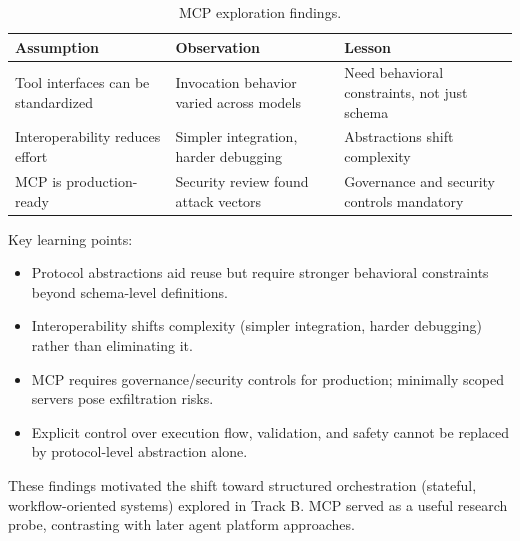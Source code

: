 \begin{table}[htbp]
    \centering
    \small
    \caption{MCP exploration findings.}
    \label{tab:MCP_Findings}
    \begin{tabular}{p{4cm}p{4.5cm}p{5cm}}
        \toprule
        \textbf{Assumption}                 & \textbf{Observation}                     & \textbf{Lesson}                              \\
        \midrule
        Tool interfaces can be standardized & Invocation behavior varied across models & Need behavioral constraints, not just schema \\
        Interoperability reduces effort     & Simpler integration, harder debugging    & Abstractions shift complexity                \\
        MCP is production-ready             & Security review found attack vectors     & Governance and security controls mandatory   \\
        \bottomrule
    \end{tabular}
\end{table}

Key learning points:
\begin{itemize}
    \item Protocol abstractions aid reuse but require stronger behavioral constraints beyond schema-level definitions.
    \item Interoperability shifts complexity (simpler integration, harder debugging) rather than eliminating it.
    \item MCP requires governance/security controls for production; minimally scoped servers pose exfiltration risks.
    \item Explicit control over execution flow, validation, and safety cannot be replaced by protocol-level abstraction alone.
\end{itemize}

These findings motivated the shift toward structured orchestration (stateful,
workflow-oriented systems) explored in Track B. MCP served as a useful research
probe, contrasting with later agent platform approaches.